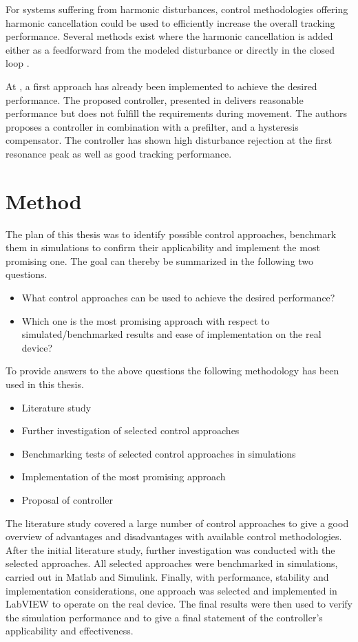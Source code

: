 For systems suffering from harmonic disturbances, control methodologies offering harmonic cancellation could be used to efficiently increase the overall tracking performance. Several methods exist where the harmonic cancellation is added either as a feedforward from the modeled disturbance \citep{fujimoto2009rro, vilanova2008disturbance} or directly in the closed loop \citep{IMP:Perry}.

At \abbrCERN, a first approach has already been implemented to achieve the desired performance. The proposed controller, presented in \citep{ButcherController:2015} delivers reasonable performance but does not fulfill the requirements during movement. The authors proposes a \abbrPID controller in combination with a prefilter, and a hysteresis compensator. The controller has shown high disturbance rejection at the first resonance peak as well as good tracking performance.

\section{Method}
The plan of this thesis was to identify possible control approaches, benchmark them in simulations to confirm their applicability and implement the most promising one. The goal can thereby be summarized in the following two questions.

\begin{itemize}
  \item What control approaches can be used to achieve the desired performance?
  \item Which one is the most promising approach with respect to simulated/benchmarked results and ease of implementation on the real device?
\end{itemize}

To provide answers to the above questions the following methodology has been used in this thesis.

\begin{itemize}
  \item Literature study
  \item Further investigation of selected control approaches
  \item Benchmarking tests of selected control approaches in simulations
  \item Implementation of the most promising approach
  \item Proposal of controller
\end{itemize}

The literature study covered a large number of control approaches to give a good overview of advantages and disadvantages with available control methodologies. After the initial literature study, further investigation was conducted with the selected approaches. All selected approaches were benchmarked in simulations, carried out in Matlab and Simulink. Finally, with performance, stability and implementation considerations, one approach was selected and implemented in LabVIEW to operate on the real device. The final results were then used to verify the simulation performance and to give a final statement of the controller's applicability and effectiveness.

